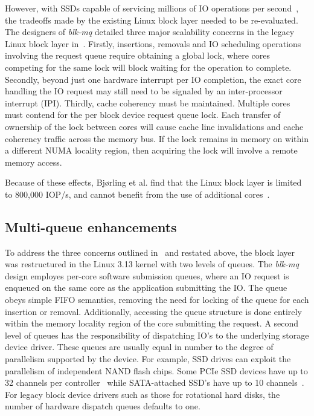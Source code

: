 \documentclass[conference]{IEEEtran}
\begin{document}
However, with SSDs capable of servicing millions of IO operations per second~\cite{zheng13}, the tradeoffs made by the existing Linux block layer needed to be re-evaluated. 
The designers of \emph{blk-mq} detailed three major
scalability concerns in the legacy Linux block layer in~\cite{bjorling13}. Firstly, insertions, removals and IO scheduling
operations involving the request queue require obtaining a global lock, where cores competing for
the same lock will block waiting for the operation to complete.
Secondly, beyond just one hardware interrupt per IO completion, the exact core handling the IO request may still need to be signaled by an inter-processor interrupt (IPI).
Thirdly, cache coherency must be maintained. Multiple cores must contend for the per block device
request queue lock. Each transfer of ownership of the lock between cores will cause cache line
invalidations and cache coherency traffic across the memory bus. If the lock remains in memory on
within a different NUMA locality region, then acquiring the lock will involve a remote memory
access.

Because of these effects, Bj{\o}rling et al. find that the Linux block layer is limited to 800,000 IOP/s, and cannot benefit from the use of additional cores~\cite{bjorling13}.




\subsection{Multi-queue enhancements}

To address the three concerns outlined in~\cite{bjorling13} and restated above, the block layer was restructured in the Linux 3.13 kernel with two levels of queues.
The \emph{blk-mq} design employes per-core software submission queues, where an IO request is enqueued on the same core as the application submitting the IO.
The queue obeys simple FIFO semantics, removing the need for locking of the queue for each insertion or removal. Additionally, accessing the queue structure 
is done entirely within the memory locality region of the core submitting the request. A second level of queues has the responsibility of dispatching IO's
to the underlying storage device driver. These queues are usually equal in number to the degree of parallelism supported by the device. For example, SSD drives can exploit the parallelism of independent NAND flash chips. Some PCIe SSD devices have up to 32 channels per controller~\cite{Cornwell:2012} while SATA-attached SSD's have up to 10 channels~\cite{www:x25spec}. For legacy block device drivers such as those for rotational hard disks, 
the number of hardware dispatch queues defaults to one.
\end{document}
